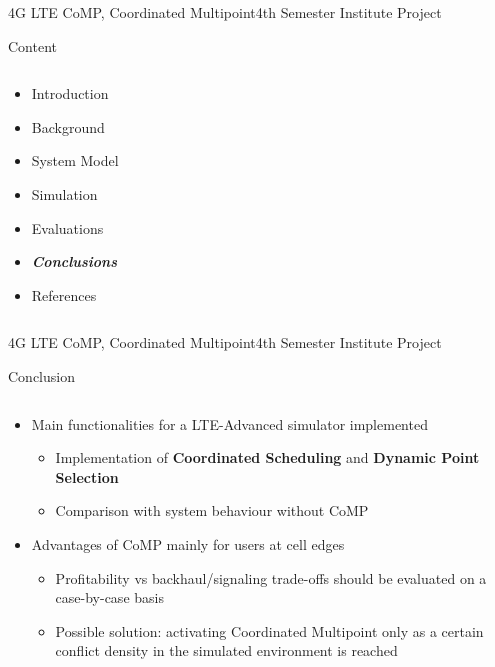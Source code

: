 \documentclass[xcolor={cmyk}]{beamer}
\begin{document}
 
\begin{frame}{4G LTE CoMP, Coordinated Multipoint}{4th Semester Institute Project}
	\begin{block}{Content}
		\begin{columns}
			\begin{column}{.9\textwidth}
				\begin{itemize}
					\item Introduction
					\item Background
					\item System Model
					\item Simulation
					\item Evaluations
					\item \textbf{\emph{Conclusions}}
					\item References
				\end{itemize}
			\end{column}
		\end{columns}
	\end{block}
\end{frame}

\begin{frame}{4G LTE CoMP, Coordinated Multipoint}{4th Semester Institute Project}
	\begin{block}{Conclusion}
		\begin{columns}
			\begin{column}{.9\textwidth}
				\begin{itemize}
					\item Main functionalities for a LTE-Advanced simulator implemented
					\begin{itemize}
						\item Implementation of \textbf{Coordinated Scheduling} and \textbf{Dynamic Point Selection}
						\item Comparison with system behaviour without CoMP
					\end{itemize}
					\item Advantages of CoMP mainly for users at cell edges
					\begin{itemize}
						\item Profitability vs backhaul/signaling trade-offs should be evaluated on a case-by-case basis
						\item Possible solution: activating Coordinated Multipoint only as a certain conflict density in the simulated environment is reached
					\end{itemize}
				\end{itemize}
			\end{column}
		\end{columns}
	\end{block}
\end{frame}
\end{document}

